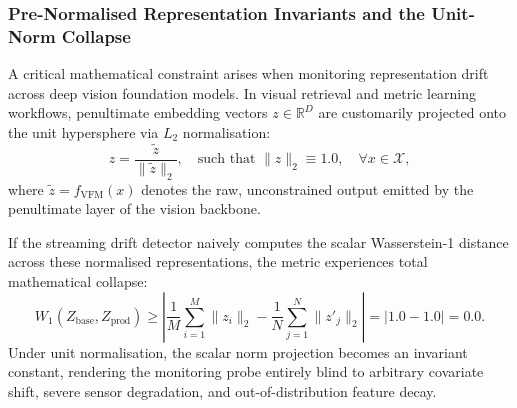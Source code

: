 \subsubsection{Pre-Normalised Representation Invariants and the Unit-Norm Collapse}
\label{sec:unit_norm_collapse}

A critical mathematical constraint arises when monitoring representation drift across deep vision foundation models. In visual retrieval and metric learning workflows, penultimate embedding vectors $z \in \mathbb{R}^D$ are customarily projected onto the unit hypersphere via $L_2$ normalisation:
\begin{equation}
    z = \frac{\tilde{z}}{\|\tilde{z}\|_2}, \quad \text{such that } \|z\|_2 \equiv 1.0, \quad \forall x \in \mathcal{X},
\end{equation}
where $\tilde{z} = f_{\text{VFM}}(x)$ denotes the raw, unconstrained output emitted by the penultimate layer of the vision backbone.

If the streaming drift detector naively computes the scalar Wasserstein-1 distance across these normalised representations, the metric experiences total mathematical collapse:
\begin{equation}
    W_1(Z_{\text{base}}, Z_{\text{prod}}) \ge \left| \frac{1}{M}\sum_{i=1}^M \|z_i\|_2 - \frac{1}{N}\sum_{j=1}^N \|z'_j\|_2 \right| = |1.0 - 1.0| = 0.0.
\end{equation}
Under unit normalisation, the scalar norm projection becomes an invariant constant, rendering the monitoring probe entirely blind to arbitrary covariate shift, severe sensor degradation, and out-of-distribution feature decay.

